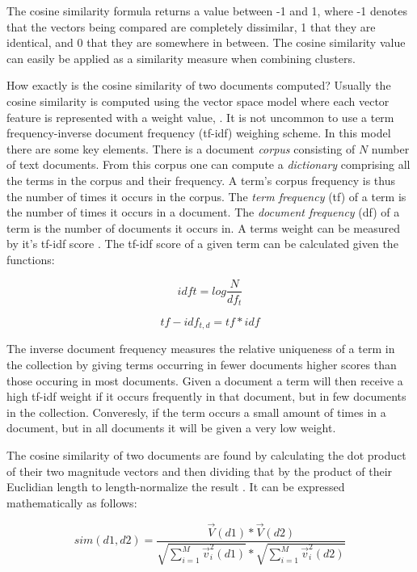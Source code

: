 The cosine similarity formula returns a value between -1 and 1, where -1 denotes that the vectors being compared are completely dissimilar, 1 that they are identical, and 0 that they are somewhere in between. The cosine similarity value can easily be applied as a similarity measure when combining clusters.

How exactly is the cosine similarity of two documents computed? Usually the cosine similarity is computed using the vector space model where each vector feature is represented with a weight value, \parencite{Manning2009a}. It is not uncommon to use a term frequency-inverse document frequency (tf-idf) weighing scheme. In this model there are some key elements. There is a document \textit{corpus} consisting of \(N\) number of text documents. From this corpus one can compute a \textit{dictionary} comprising all the terms in the corpus and their frequency. A term's corpus frequency is thus the number of times it occurs in the corpus. The \textit{term frequency} (tf) of a term is the number of times it occurs in a document. The \textit{document frequency} (df) of a term is the number of documents it occurs in. A terms weight can be measured by it's tf-idf score \parencite{Manning2009a}. The tf-idf score of a given term can be calculated given the functions:


\begin{displaymath}
idf{t} = log \frac{N}{df_{t}} 
\end{displaymath}

\begin{displaymath}
tf-idf_{t,d} = tf * idf
\end{displaymath}

The inverse document frequency measures the relative uniqueness of a term in the collection by giving terms occurring in fewer documents higher scores than those occuring in most documents. Given a document a term will then receive a high tf-idf weight if it occurs frequently in that document, but in few documents in the collection. Converesly, if the term occurs a small amount of times in a document, but in all documents it will be given a very low weight.

The cosine similarity of two documents are found by calculating the dot product of their two magnitude vectors and then dividing that by the product of their Euclidian length to length-normalize the result \cite{Manning2009a}. It can be expressed mathematically as follows:

\begin{displaymath}
sim(d1, d2) = \frac{\vec{V}(d1) * \vec{V}(d2)}
{\sqrt{\sum_{i = 1}^M\vec{v}_{i}^2(d1)} * \sqrt{\sum_{i = 1}^M\vec{v}_{i}^2(d2)}}
\end{displaymath}

